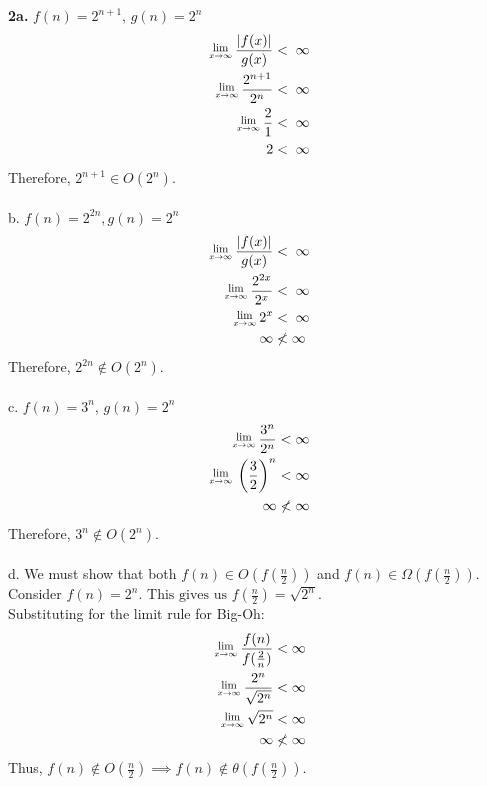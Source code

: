 \documentclass[12pt]{report}
\newcommand{\Lim}[1]{\raisebox{0.5ex}{\scalebox{0.8}{$\displaystyle \lim_{#1}\;$}}}
\newcommand{\MLim}{\Lim{x\rightarrow\infty}}
\newcommand{\no}{\noindent}
\newcommand{\tab}{\hspace*{.6cm}}
\begin{document}
	\pagebreak
	\no \textbf{2a.} $f(n) = 2^{n+1} \text{, } g(n) = 2^n$ \\
	\begin{align*}
	\Lim{x\rightarrow\infty} \frac{|f(x)|}{g(x)} &< \; \infty \\
	\Lim{x\rightarrow\infty} \frac{2^{n+1}}{2^n} &< \; \infty \\
	\Lim{x\rightarrow\infty} \frac{2}{1} &< \; \infty \\
	2 &< \; \infty \\
	\end{align*}
	\tab Therefore, $2^{n+1} \in O(2^n)$.\\ \\
	\no b. $f(n) = 2^{2n}, g(n) = 2^n $
	\begin{align*}
	\MLim \frac{|f(x)|}{g(x)} &< \; \infty \\
	\MLim \frac{2^{2x}}{2^x} &< \; \infty \\
	\MLim 2^x &< \; \infty \\
	\infty &\nless \infty\\
	\end{align*}
	\tab Therefore, $2^{2n} \notin O(2^n)$.\\ \\
	\no c. $f(n) = 3^n $, $g(n) = 2^n$ \\
	\begin{align*}
	\MLim \frac{3^n}{2^n} &< \infty \\
	\MLim \left(\frac{3}{2}\right)^n &< \infty\\
	\infty &\nless \infty
	\end{align*}
	\tab Therefore, $ 3^n \notin O(2^n)$.\\ \\
	
	\pagebreak
	\no d. We must show that both $f(n) \in O(f(\frac{n}{2}))$ and $f(n) \in \Omega(f(\frac{n}{2}))$. Consider $f(n) = 2^n\text{. This gives us } f(\frac{n}{2}) = \sqrt{2^n}$. \\
	\tab Substituting for the limit rule for Big-Oh: \\
	\begin{align*}
	\MLim \frac{f(n)}{f(\frac{2}{n})} &< \infty \\
	\MLim \frac{2^n}{\sqrt{2^n}} &< \infty \\
	\MLim \sqrt{2^n} &< \infty \\
	\infty &\nless \infty
	\end{align*}
	\tab Thus, $f(n) \notin O(\frac{n}{2}) \implies f(n) \notin \theta(f(\frac{n}{2}))$. \\
	
\end{document}
